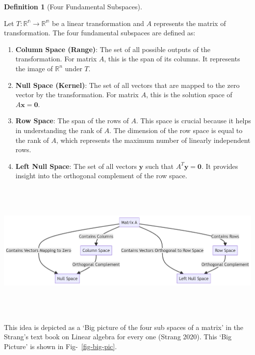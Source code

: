 \documentclass[
  letterpaper,
  DIV=11,
  numbers=noendperiod]{scrreprt}
\theoremstyle{plain}
\theoremstyle{definition}
\newtheorem{definition}{Definition}[chapter]
\theoremstyle{remark}
\begin{document}
\begin{definition}[Four Fundamental
Subspaces]\protect\hypertarget{def-FFS}{}\label{def-FFS}

Let \(T:\mathbb{R^n}\longrightarrow \mathbb{R^m}\) be a linear
transformation and \(A\) represents the matrix of transformation. The
four fundamental subspaces are defined as:

\begin{enumerate}
\def\labelenumi{\arabic{enumi}.}
\item
  \textbf{Column Space (Range)}: The set of all possible outputs of the
  transformation. For matrix \(A\), this is the span of its columns. It
  represents the image of \(\mathbb{R}^n\) under \(T\).
\item
  \textbf{Null Space (Kernel)}: The set of all vectors that are mapped
  to the zero vector by the transformation. For matrix \(A\), this is
  the solution space of \(A \mathbf{x} = \mathbf{0}\).
\item
  \textbf{Row Space}: The span of the rows of \(A\). This space is
  crucial because it helps in understanding the rank of \(A\). The
  dimension of the row space is equal to the rank of \(A\), which
  represents the maximum number of linearly independent rows.
\item
  \textbf{Left Null Space}: The set of all vectors \(\mathbf{y}\) such
  that \(A^T \mathbf{y} = \mathbf{0}\). It provides insight into the
  orthogonal complement of the row space.
\end{enumerate}

\end{definition}

\includegraphics[width=9.49in,height=2.67in]{module_2_files/figure-latex/mermaid-figure-1.png}

This idea is depicted as a `Big picture of the four sub spaces of a
matrix' in the Strang's text book on Linear algebra for every one
(Strang 2020). This `Big Picture' is shown in Fig-~\ref{fig-big-pic}.
\end{document}
